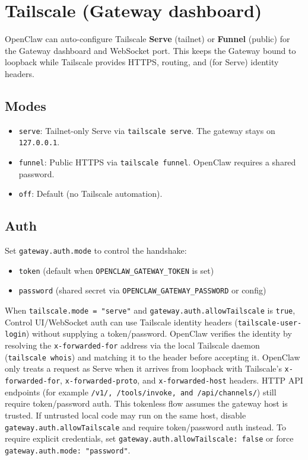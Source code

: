 \clearpage

\section{Tailscale (Gateway dashboard)}


OpenClaw can auto-configure Tailscale \textbf{Serve} (tailnet) or \textbf{Funnel} (public) for the
Gateway dashboard and WebSocket port. This keeps the Gateway bound to loopback while
Tailscale provides HTTPS, routing, and (for Serve) identity headers.

\subsection{Modes}


\begin{itemize}
  \item \texttt{serve}: Tailnet-only Serve via \texttt{tailscale serve}. The gateway stays on \texttt{127.0.0.1}.
  \item \texttt{funnel}: Public HTTPS via \texttt{tailscale funnel}. OpenClaw requires a shared password.
  \item \texttt{off}: Default (no Tailscale automation).
\end{itemize}


\subsection{Auth}


Set \texttt{gateway.auth.mode} to control the handshake:

\begin{itemize}
  \item \texttt{token} (default when \texttt{OPENCLAW\_GATEWAY\_TOKEN} is set)
  \item \texttt{password} (shared secret via \texttt{OPENCLAW\_GATEWAY\_PASSWORD} or config)
\end{itemize}


When \texttt{tailscale.mode = "serve"} and \texttt{gateway.auth.allowTailscale} is \texttt{true},
Control UI/WebSocket auth can use Tailscale identity headers
(\texttt{tailscale-user-login}) without supplying a token/password. OpenClaw verifies
the identity by resolving the \texttt{x-forwarded-for} address via the local Tailscale
daemon (\texttt{tailscale whois}) and matching it to the header before accepting it.
OpenClaw only treats a request as Serve when it arrives from loopback with
Tailscale’s \texttt{x-forwarded-for}, \texttt{x-forwarded-proto}, and \texttt{x-forwarded-host}
headers.
HTTP API endpoints (for example \texttt{/v1/\textit{}, \texttt{/tools/invoke}, and \texttt{/api/channels/}})
still require token/password auth.
This tokenless flow assumes the gateway host is trusted. If untrusted local code
may run on the same host, disable \texttt{gateway.auth.allowTailscale} and require
token/password auth instead.
To require explicit credentials, set \texttt{gateway.auth.allowTailscale: false} or
force \texttt{gateway.auth.mode: "password"}.


